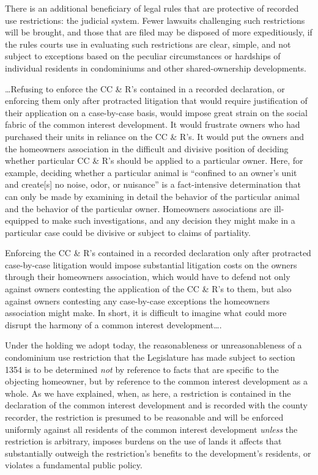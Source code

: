 There is an additional beneficiary of legal rules that are protective of
recorded use restrictions: the judicial system. Fewer lawsuits challenging such
restrictions will be brought, and those that are filed may be disposed of more
expeditiously, if the rules courts use in evaluating such restrictions are
clear, simple, and not subject to exceptions based on the peculiar circumstances
or hardships of individual residents in condominiums and other shared-ownership
developments.

\ldots Refusing to enforce the CC \& R's contained in a recorded declaration, or
enforcing them only after protracted litigation that would require justification
of their application on a case-by-case basis, would impose great strain on the
social fabric of the common interest development. It would frustrate owners who
had purchased their units in reliance on the CC \& R's. It would put the owners
and the homeowners association in the difficult and divisive position of
deciding whether particular CC \& R's should be applied to a particular owner.
Here, for example, deciding whether a particular animal is ``confined to an
owner's unit and create[s] no noise, odor, or nuisance'' is a fact-intensive
determination that can only be made by examining in detail the behavior of the
particular animal and the behavior of the particular owner. Homeowners
associations are ill-equipped to make such investigations, and any decision they
might make in a particular case could be divisive or subject to claims of
partiality.

Enforcing the CC \& R's contained in a recorded declaration only after
protracted case-by-case litigation would impose substantial litigation costs on
the owners through their homeowners association, which would have to defend not
only against owners contesting the application of the CC \& R's to them, but
also against owners contesting any case-by-case exceptions the homeowners
association might make. In short, it is difficult to imagine what could more
disrupt the harmony of a common interest development\ldots .

Under the holding we adopt today, the reasonableness or unreasonableness of a
condominium use restriction that the Legislature has made subject to section
1354 is to be determined \textit{not} by reference to facts that are specific to
the objecting homeowner, but by reference to the common interest development as
a whole. As we have explained, when, as here, a restriction is contained in the
declaration of the common interest development and is recorded with the county
recorder, the restriction is presumed to be reasonable and will be enforced
uniformly against all residents of the common interest development
\textit{unless} the restriction is arbitrary, imposes burdens on the use of
lands it affects that substantially outweigh the restriction's benefits to the
development's residents, or violates a fundamental public policy.

